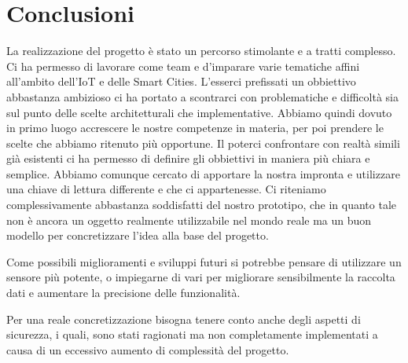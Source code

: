 \section{Conclusioni}

La realizzazione del progetto è stato un percorso stimolante e a tratti complesso. Ci ha permesso di lavorare come team e d’imparare varie tematiche affini all’ambito dell’IoT e delle Smart Cities.
L’esserci prefissati un obbiettivo abbastanza ambizioso ci ha portato a scontrarci con problematiche e difficoltà sia sul punto delle scelte architetturali che implementative. Abbiamo quindi dovuto in primo luogo accrescere le nostre competenze in materia, per poi prendere le scelte che abbiamo ritenuto più opportune.
Il poterci confrontare con realtà simili già esistenti ci ha permesso di definire gli obbiettivi in maniera più chiara e semplice.
Abbiamo comunque cercato di apportare la nostra impronta e utilizzare una chiave di lettura differente e che ci appartenesse. Ci riteniamo complessivamente abbastanza soddisfatti del nostro prototipo, che in quanto tale non è ancora un oggetto realmente utilizzabile nel mondo reale ma un buon modello per concretizzare l'idea alla base del progetto.

Come possibili miglioramenti e sviluppi futuri si potrebbe pensare di utilizzare un sensore più potente, o impiegarne di vari per migliorare sensibilmente la raccolta dati e aumentare la precisione delle funzionalità.

Per una reale concretizzazione bisogna tenere conto anche degli aspetti di sicurezza, i quali, sono stati ragionati ma non completamente implementati a causa di un eccessivo aumento di complessità del progetto.
